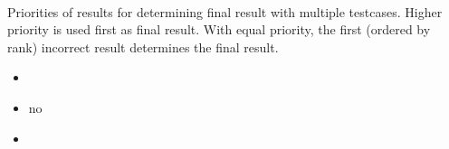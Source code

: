 \documentclass[a4paper,10pt,english,openany]{sphinxmanual}
\begin{document}
\paragraph{}
\label{\detokenize{configuration-reference:results-prio}}
\sphinxAtStartPar
Priorities of results for determining final result with multiple testcases. Higher priority is used first as final result. With equal priority, the first (ordered by rank) incorrect result determines the final result.
\begin{itemize}
\item {} 
\sphinxAtStartPar
{} 

\item {} 
\sphinxAtStartPar
{} no

\item {} 
\sphinxAtStartPar
{}

\begin{sphinxVerbatim}[commandchars=\\\{\}]
\end{sphinxVerbatim}

\end{itemize}
\end{document}
